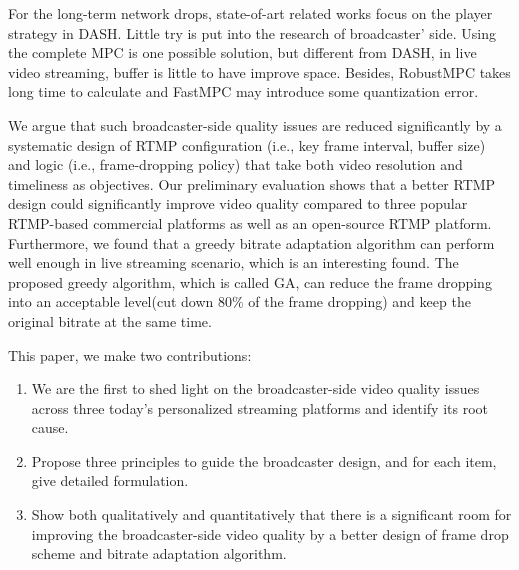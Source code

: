 For the long-term network drops, state-of-art related works focus on the player strategy in DASH. Little try is put into the research of broadcaster' side. Using the complete MPC is one possible solution, but different from DASH, in live video streaming, buffer is little to have improve space. Besides, RobustMPC takes long time to calculate and FastMPC may introduce some quantization error.

We argue that such broadcaster-side quality issues are reduced significantly
by a systematic design of RTMP configuration (i.e., key frame
interval, buffer size) and logic (i.e., frame-dropping policy) that take
both video resolution and timeliness as objectives.
Our preliminary evaluation shows that a better RTMP design
could significantly improve video quality compared to three popular
RTMP-based commercial  platforms as well as an open-source
RTMP platform.
Furthermore, we found that a greedy bitrate adaptation algorithm can perform well enough in live streaming scenario, which is an interesting found.
The proposed greedy algorithm, which is called GA, can reduce the frame dropping into an acceptable level(cut down $80\%$ of the frame dropping) and keep the original bitrate at the same time.



This paper, we make two contributions:
\begin{enumerate}
\item We are the first to shed light on the broadcaster-side video quality issues across three today's personalized streaming platforms and identify its root cause.
\item Propose three principles to guide the broadcaster design, and for each item, give detailed formulation.
\item Show both qualitatively and quantitatively that there is a significant room for improving the broadcaster-side video quality by a better design of frame drop scheme and bitrate adaptation algorithm.

\end{enumerate}


